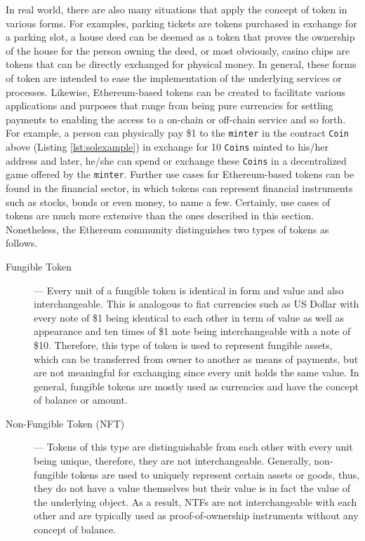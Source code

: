 In real world, there are also many situations that apply the concept of token in various forms. For examples, parking tickets are tokens purchased in exchange for a parking slot, a house deed can be deemed as a token that proves the ownership of the house for the person owning the deed, or most obviously, casino chips are tokens that can be directly exchanged for physical money. In general, these forms of token are intended to ease the implementation of the underlying services or processes. Likewise, Ethereum-based tokens can be created to facilitate various applications and purposes that range from being pure currencies for settling payments to enabling the access to a on-chain or off-chain service and so forth. For example, a person can physically pay \$1 to the \texttt{minter} in the contract \texttt{Coin} above (Listing \ref{lst:solexample}) in exchange for 10 \texttt{Coins} minted to his/her address and later, he/she can spend or exchange these \texttt{Coins} in a decentralized game offered by the \texttt{minter}. Further use cases for Ethereum-based tokens can be found in the financial sector, in which tokens can represent financial instruments such as stocks, bonds or even money, to name a few. Certainly, use cases of tokens are much more extensive than the ones described in this section. Nonetheless, the Ethereum community distinguishes two types of tokens as follows.


\begin{description}
	\item[Fungible Token] --- Every unit of a fungible token is identical in form and value and also interchangeable. This is analogous to fiat currencies such as US Dollar with every note of \$1 being identical to each other in term of value as well as appearance and ten times of \$1 note being interchangeable with a note of \$10. Therefore, this type of token is used to represent fungible assets, which can be transferred from owner to another as means of payments, but are not meaningful for exchanging since every unit holds the same value. In general, fungible tokens are mostly used as currencies and have the concept of balance or amount.

	\item[Non-Fungible Token (NFT)] --- Tokens of this type are distinguishable from each other with every unit being unique, therefore, they are not interchangeable. Generally, non-fungible tokens are used to uniquely represent certain assets or goods, thus, they do not have a value themselves but their value is in fact the value of the underlying object. As a result, NTFs are not interchangeable with each other and are typically used as proof-of-ownership instruments without any concept of balance.
\end{description}


